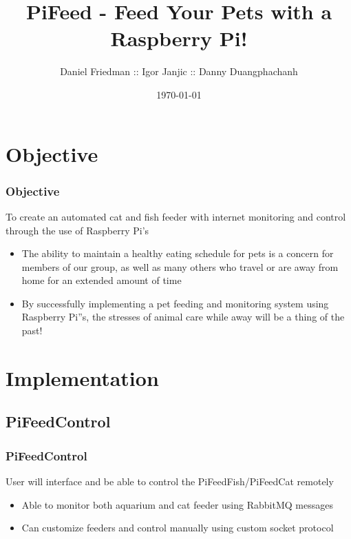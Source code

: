 \documentclass[]{beamer}
\title{PiFeed - Feed Your Pets with a Raspberry Pi!}
\author{Daniel Friedman :: Igor Janjic :: Danny Duangphachanh}
\institute{Virginia Tech}
\date{\today}
\begin{document}
\begin{frame}
  \titlepage
\end{frame}
\note{}


\section{Objective}
\begin{frame}
	\frametitle{Objective}
    To create an automated cat and fish feeder with internet monitoring and control through the use of Raspberry Pi's
    \begin{itemize}
    	\item The ability to maintain a healthy eating schedule for pets is a concern for members of our group, as well as many others who travel or are away from home for an extended amount of time
        \item By successfully implementing a pet feeding and monitoring system using Raspberry Pi''s, the stresses of animal care while away will be a thing of the past!
    \end{itemize}
\end{frame}


\section{Implementation}
\subsection{PiFeedControl}
\begin{frame}
	\frametitle{PiFeedControl}
    User will interface and be able to control the PiFeedFish/PiFeedCat remotely
    \begin{itemize}
    	\item Able to monitor both aquarium and cat feeder using RabbitMQ messages
        \item Can customize feeders and control manually using custom socket protocol
    \end{itemize}
\end{frame}
\end{document}
